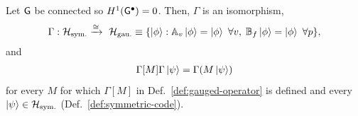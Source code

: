\documentclass[11pt]{article}
\begin{document}
\begin{lemma}
\label{lem:gauging-map-isomorphism}
    Let $\mathsf{G}$ be connected so $H^1(\mathsf{G}^\bullet)=0$. 
    Then, $\Gamma$ is an isomorphism,
    \begin{align}
        \Gamma:\mathcal H_{\rm sym.}\xrightarrow[]{\cong} \ \mathcal{H}_{\rm gau.} \equiv \{\ket{\phi}: \av\ket{\phi}=\ket{\phi}\ \forall v,\; \bp\ket{\phi}=\ket{\phi}\ \forall p\}, 
    \end{align}
    and 
    \begin{align}
        \Gamma[M]\Gamma\ket{\psi} = \Gamma(M\ket{\psi})
        \label{eq:gauging-map-associativity}
    \end{align}
    for every $M$ for which $\Gamma[M]$ in Def.~\ref{def:gauged-operator} is defined and every $\ket{\psi}\in \mathcal H_{\rm sym.}$ (Def.~\ref{def:symmetric-code}).
\end{lemma}
\end{document}
